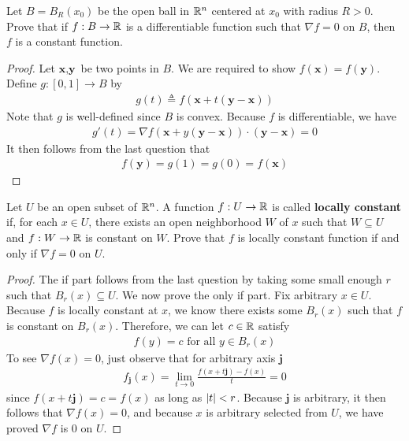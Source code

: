 \documentclass{report}
\begin{document}
\begin{question}{}{}
Let $B=B_R(x_0)$ be the open ball in $\mathbb{R}^n$ centered at  $x_0$ with radius  $R>0$. Prove that if  $f:B\rightarrow \mathbb{R}$ is a differentiable function such that $\nabla f=0$ on $B$, then  $f$ is a constant function. 
\end{question}
\begin{proof}
Let $\textbf{x},\textbf{y}$ be two points in $B$. We are required to show $f(\textbf{x})=f(\textbf{y})$. Define $g:[0,1]\rightarrow B$ by 
\begin{align*}
g(t)\triangleq f(\textbf{x}+t(\textbf{y}-\textbf{x}))
\end{align*}
Note that $g$ is well-defined since $B$ is convex. Because $f$ is differentiable, we have 
\begin{align*}
g'(t)=\nabla f (\textbf{x}+y (\textbf{y}-\textbf{x})) \cdot (\textbf{y}-\textbf{x})=0 
\end{align*}
It then follows from the last question that 
\begin{align*}
f(\textbf{y})=g(1)=g(0)=f(\textbf{x})
\end{align*}
\end{proof}
\begin{question}{}{}
Let $U$ be an open subset of $\mathbb{R}^n$. A function  $f:U\rightarrow \mathbb{R}$ is called \textbf{locally constant} if, for each $x\in U$, there exists an open neighborhood  $W$ of $x$ such that $W \subseteq U$ and $f:W\rightarrow \mathbb{R}$ is constant on $W$. Prove that $f$ is locally constant function if and only if $\nabla f=0$ on $U$. 
\end{question}
\begin{proof}
The if part follows from the last question by taking some small enough $r$ such that  $B_r(x)\subseteq U$. We now prove the only if part. Fix arbitrary $x \in U$. Because $f$ is locally constant at $x$, we know there exists some  $B_r(x)$ such that $f$ is constant on $B_r(x)$. Therefore, we can let $c\in\mathbb{R}$ satisfy 
\begin{align*}
f(y)=c \text{ for all } y\in B_r(x) 
\end{align*}
To see $\nabla f(x)=0$, just observe that for arbitrary axis $\textbf{j}$
\begin{align*}
f_{\textbf{j}}(x)=\lim_{t\to 0} \frac{f(x+t\textbf{j})-f(x)}{t}=0
\end{align*}
since $f(x+t\textbf{j})=c=f(x)$ as long as $\left|t\right|<r$. Because $\textbf{j}$ is arbitrary, it then follows that $\nabla f(x)=0$, and because $x$ is arbitrary selected from $U$, we have proved  $\nabla f$ is $0$ on  $U$.
\end{proof}
\end{document}
